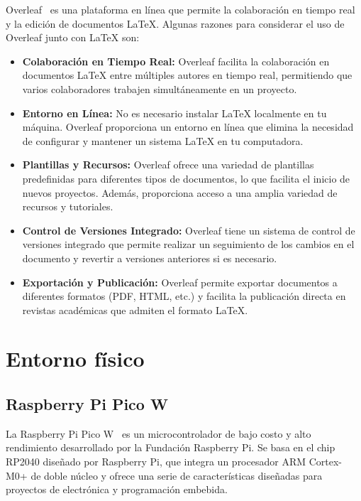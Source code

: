 Overleaf~\cite{misc:Overleaf} es una plataforma en línea que permite la colaboración en tiempo real y la edición de documentos LaTeX. Algunas razones para considerar el uso de Overleaf junto con LaTeX son:
\begin{itemize}
	\item \textbf{Colaboración en Tiempo Real:}
Overleaf facilita la colaboración en documentos LaTeX entre múltiples autores en tiempo real, permitiendo que varios colaboradores trabajen simultáneamente en un proyecto.

\item \textbf{Entorno en Línea:}
No es necesario instalar LaTeX localmente en tu máquina. Overleaf proporciona un entorno en línea que elimina la necesidad de configurar y mantener un sistema LaTeX en tu computadora.

\item \textbf{Plantillas y Recursos:}
Overleaf ofrece una variedad de plantillas predefinidas para diferentes tipos de documentos, lo que facilita el inicio de nuevos proyectos. Además, proporciona acceso a una amplia variedad de recursos y tutoriales.

\item \textbf{Control de Versiones Integrado:}
Overleaf tiene un sistema de control de versiones integrado que permite realizar un seguimiento de los cambios en el documento y revertir a versiones anteriores si es necesario.

\item \textbf{Exportación y Publicación:}
Overleaf permite exportar documentos a diferentes formatos (PDF, HTML, etc.) y facilita la publicación directa en revistas académicas que admiten el formato LaTeX.
\end{itemize}
\pagebreak

\section{Entorno físico}
\subsection{Raspberry Pi Pico W}
La Raspberry Pi Pico W~\cite{manual:RPiPicoW_datasheet} es un microcontrolador de bajo costo y alto rendimiento desarrollado por la Fundación Raspberry Pi. Se basa en el chip RP2040 diseñado por Raspberry Pi, que integra un procesador ARM Cortex-M0+ de doble núcleo y ofrece una serie de características diseñadas para proyectos de electrónica y programación embebida.

